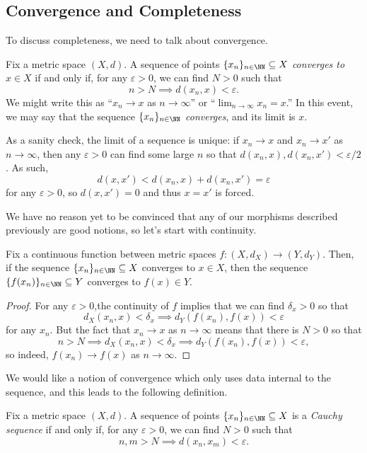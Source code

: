 \documentclass[../notes.tex]{subfiles}
\begin{document}
\subsection{Convergence and Completeness}
To discuss completeness, we need to talk about convergence.
\begin{definition}[Converge]
	Fix a metric space $(X,d)$. A sequence of points $\{x_n\}_{n\in\NN}\subseteq X$ \textit{converges to} $x\in X$ if and only if, for any $\varepsilon>0$, we can find $N>0$ such that
	\[n>N\implies d(x_n,x)<\varepsilon.\]
	We might write this as ``$x_n\to x$ as $n\to\infty$'' or ``$\lim_{n\to\infty}x_n=x$.'' In this event, we may say that the sequence $\{x_n\}_{n\in\NN}$ \textit{converges}, and its limit is $x$.
\end{definition}
\begin{remark}[Nir] \label{rem:uniqlim}
	As a sanity check, the limit of a sequence is unique: if $x_n\to x$ and $x_n\to x'$ as $n\to\infty$, then any $\varepsilon>0$ can find some large $n$ so that $d(x_n,x),d(x_n,x')<\varepsilon/2$. As such,
	\[d(x,x')<d(x_n,x)+d(x_n,x')=\varepsilon\]
	for any $\varepsilon>0$, so $d(x,x')=0$ and thus $x=x'$ is forced.
\end{remark}
We have no reason yet to be convinced that any of our morphisms described previously are good notions, so let's start with continuity.
\begin{lemma} \label{lem:contpreservesconverge}
	Fix a continuous function between metric spaces $f\colon(X,d_X)\to(Y,d_Y)$. Then, if the sequence $\{x_n\}_{n\in\NN}\subseteq X$ converges to $x\in X$, then the sequence $\{f(x_n)\}_{n\in\NN}\subseteq Y$ converges to $f(x)\in Y$.
\end{lemma}
\begin{proof}
	For any $\varepsilon>0$,the continuity of $f$ implies that we can find $\delta_x>0$ so that
	\[d_X(x_n,x)<\delta_x\implies d_Y(f(x_n),f(x))<\varepsilon\]
	for any $x_n$. But the fact that $x_n\to x$ as $n\to\infty$ means that there is $N>0$ so that
	\[n>N\implies d_X(x_n,x)<\delta_x\implies d_Y(f(x_n),f(x))<\varepsilon,\]
	so indeed, $f(x_n)\to f(x)$ as $n\to\infty$.
\end{proof}
We would like a notion of convergence which only uses data internal to the sequence, and this leads to the following definition.
\begin{definition}[Cauchy]
	Fix a metric space $(X,d)$. A sequence of points $\{x_n\}_{n\in\NN}\subseteq X$ is a \textit{Cauchy sequence} if and only if, for any $\varepsilon>0$, we can find $N>0$ such that
	\[n,m>N\implies d(x_n,x_m)<\varepsilon.\]
\end{definition}
\end{document}
